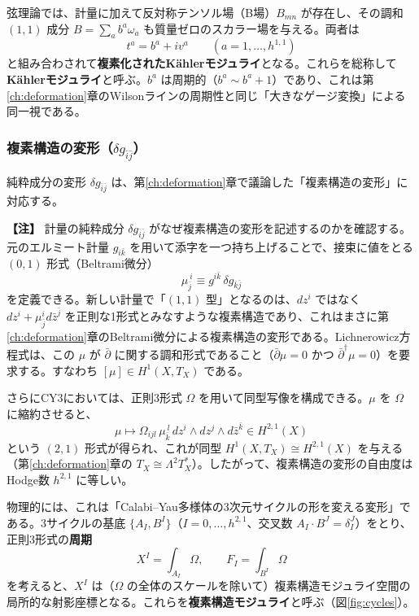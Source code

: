 \documentclass[uplatex, dvipdfmx, book]{jsbook}
\let\origsubsubsection\subsubsection
\renewcommand{\subsection}{\origsubsubsection}
\renewcommand{\subsubsection}{\paragraph}
\newenvironment{note}{\vspace{1ex}\par\footnotesize\noindent\textbf{【注】}}{\par\vspace{1ex}}
\begin{document}
弦理論では、計量に加えて反対称テンソル場（B場）$B_{mn}$ が存在し、その調和 $(1,1)$ 成分 $B = \sum_a b^a\omega_a$ も質量ゼロのスカラー場を与える。両者は
\begin{equation}
    t^a = b^a + i v^a \qquad (a = 1, \dots, h^{1,1})
\end{equation}
と組み合わされて\textbf{複素化されたK\"ahlerモジュライ}となる。これらを総称して\textbf{K\"ahlerモジュライ}と呼ぶ。$b^a$ は周期的（$b^a \sim b^a + 1$）であり、これは第\ref{ch:deformation}章のWilsonラインの周期性と同じ「大きなゲージ変換」による同一視である。

\subsection{複素構造の変形（$\delta g_{\bar{i}\bar{j}}$）}

純粋成分の変形 $\delta g_{\bar{i}\bar{j}}$ は、第\ref{ch:deformation}章で議論した「複素構造の変形」に対応する。

\begin{note}
計量の純粋成分 $\delta g_{\bar{i}\bar{j}}$ がなぜ複素構造の変形を記述するのかを確認する。元のエルミート計量 $g_{i\bar{k}}$ を用いて添字を一つ持ち上げることで、接束に値をとる $(0,1)$ 形式（Beltrami微分）
\begin{equation*}
    \mu^{\ i}_{\bar{j}} \equiv g^{i\bar{k}}\, \delta g_{\bar{k}\bar{j}}
\end{equation*}
を定義できる。新しい計量で「$(1,1)$ 型」となるのは、$dz^i$ ではなく $dz^i + \mu^i_{\bar j}d\bar z^{\bar j}$ を正則な1形式とみなすような複素構造であり、これはまさに第\ref{ch:deformation}章のBeltrami微分による複素構造の変形である。Lichnerowicz方程式は、この $\mu$ が $\bar{\partial}$ に関する調和形式であること（$\bar{\partial} \mu = 0$ かつ $\bar{\partial}^\dagger \mu = 0$）を要求する。すなわち $[\mu] \in H^1(X, T_X)$ である。

さらにCY3においては、正則3形式 $\Omega$ を用いて同型写像を構成できる。$\mu$ を $\Omega$ に縮約させると、
\begin{equation*}
    \mu \mapsto \Omega_{ijl}\, \mu^{\ l}_{\bar{k}}\, dz^i \wedge dz^j \wedge d\bar{z}^{\bar{k}} \in H^{2,1}(X)
\end{equation*}
という $(2,1)$ 形式が得られ、これが同型 $H^1(X, T_X) \cong H^{2,1}(X)$ を与える（第\ref{ch:deformation}章の $T_X \cong \Lambda^{2}T^*_X$）。したがって、複素構造の変形の自由度はHodge数 $h^{2,1}$ に等しい。
\end{note}

物理的には、これは「Calabi--Yau多様体の3次元サイクルの形を変える変形」である。3サイクルの基底 $\{A_I, B^I\}$（$I = 0, \dots, h^{2,1}$、交叉数 $A_I \cdot B^J = \delta_I^J$）をとり、正則3形式の\textbf{周期}
\begin{equation}
    X^I = \int_{A_I}\Omega, \qquad F_I = \int_{B^I}\Omega
\end{equation}
を考えると、$X^I$ は（$\Omega$ の全体のスケールを除いて）複素構造モジュライ空間の局所的な射影座標となる。これらを\textbf{複素構造モジュライ}と呼ぶ（図\ref{fig:cycles}）。
\end{document}
